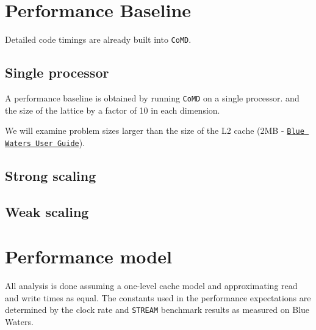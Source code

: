 \documentclass[12pt]{article}
\begin{document}

\section{Performance Baseline}

Detailed code timings are already built into \texttt{CoMD}. 



%
% 
%

%
% 
%
\subsection{Single processor}
A performance baseline is obtained by running \texttt{CoMD} on a single processor.
and the size of the lattice by a factor of 10 in each dimension.


We will examine problem sizes larger than the size of the L2 cache (2MB - 
\href{https://bluewaters.ncsa.illinois.edu/user-guide}{\texttt{Blue Waters User Guide}}).

\subsection{Strong scaling}

\subsection{Weak scaling}

\section{Performance model}
All analysis is done assuming a one-level cache model and
approximating read and write times as equal.  The constants used in
the performance expectations are determined by the clock rate and
\texttt{STREAM} benchmark results as measured on Blue Waters.
\end{document}
